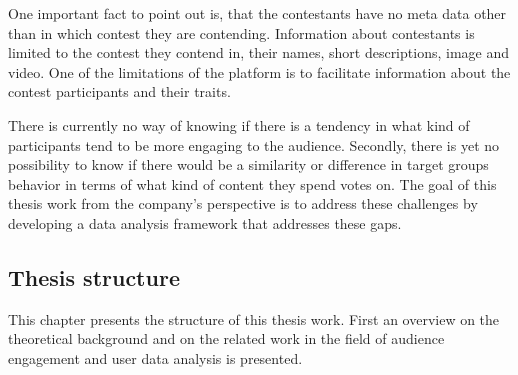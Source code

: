     One important fact to point out is, that the contestants have no meta data other than in which contest they are contending. Information about contestants is limited to the contest they contend in, their names, short descriptions, image and video. One of the limitations of the platform is to facilitate information about the contest participants and their traits. 
    
    There is currently no way of knowing if there is a tendency in what kind of participants tend to be more engaging to the audience. Secondly, there is yet no possibility to know if there would be a similarity or difference in target groups behavior in terms of what kind of content they spend votes on. The goal of this thesis work from the company's perspective is to address these challenges by developing a data analysis framework that addresses these gaps.

\subsection{Thesis structure}
    This chapter presents the structure of this thesis work. First an overview on the theoretical background and on the related work in the field of audience engagement and user data analysis is presented. %